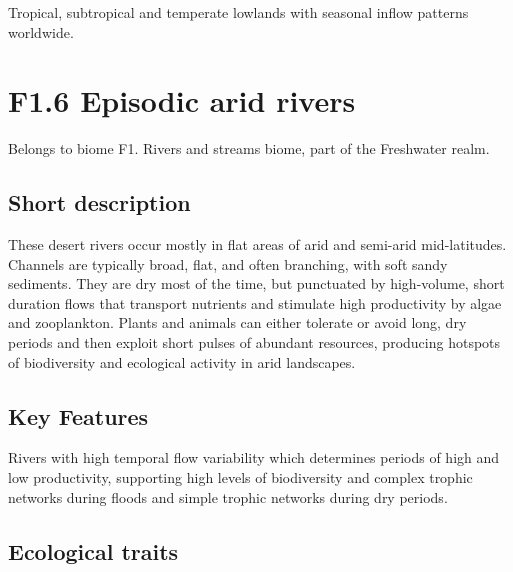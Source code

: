 \documentclass[
  letterpaper,
  DIV=11,
  numbers=noendperiod]{scrartcl}
\begin{document}
Tropical, subtropical and temperate lowlands with seasonal inflow
patterns worldwide.

\section{F1.6 Episodic arid rivers}\label{f1.6-episodic-arid-rivers-1}

Belongs to biome F1. Rivers and streams biome, part of the Freshwater
realm.

\subsection{Short description}\label{short-description-114}

These desert rivers occur mostly in flat areas of arid and semi-arid
mid-latitudes. Channels are typically broad, flat, and often branching,
with soft sandy sediments. They are dry most of the time, but punctuated
by high-volume, short duration flows that transport nutrients and
stimulate high productivity by algae and zooplankton. Plants and animals
can either tolerate or avoid long, dry periods and then exploit short
pulses of abundant resources, producing hotspots of biodiversity and
ecological activity in arid landscapes.

\subsection{Key Features}\label{key-features-114}

Rivers with high temporal flow variability which determines periods of
high and low productivity, supporting high levels of biodiversity and
complex trophic networks during floods and simple trophic networks
during dry periods.

\subsection{Ecological traits}\label{ecological-traits-114}
\end{document}

